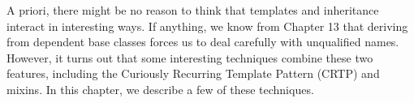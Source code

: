 A priori, there might be no reason to think that templates and inheritance interact in interesting ways. If anything, we know from Chapter 13 that deriving from dependent base classes forces us to deal carefully with unqualified names. However, it turns out that some interesting techniques combine these two features, including the Curiously Recurring Template Pattern (CRTP) and mixins. In this chapter, we describe a few of these techniques.